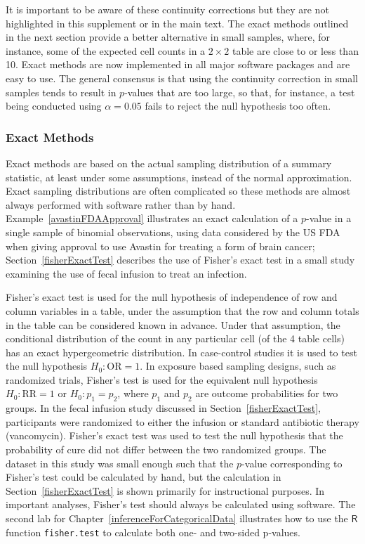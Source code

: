 It is important to be aware of these continuity corrections but they are not highlighted in this supplement or in the main text. The exact methods outlined in the next section provide a better alternative in small samples, where, for instance, some of the expected cell counts in a $2 \times 2$ table are close to or less than 10.  Exact methods are now implemented in all major software packages and are easy to use.   The general consensus is that using the continuity correction in small samples tends to result in $p$-values that are too large, so that, for instance, a test being conducted using $\alpha = 0.05$ fails to reject the null hypothesis too often.


\subsubsection{Exact Methods}

Exact methods are based on the actual sampling distribution of a summary statistic, at least under some assumptions, instead of the normal approximation.  Exact sampling distributions are often complicated so these methods are almost always performed with software rather than by hand. Example~\ref{avastinFDAApproval} illustrates an exact calculation of a $p$-value in a single sample of binomial observations, using data considered by the US FDA when giving approval to use Avastin for treating a form of brain cancer; Section~\ref{fisherExactTest} describes the use of Fisher's exact test in a small study examining the use of fecal infusion to treat an infection.
 
Fisher's exact test is used for the null hypothesis of independence of row and column variables in a table, under the assumption that the row and column totals in the table can be considered known in advance.  Under that assumption, the conditional distribution of the count in any particular cell (of the 4 table cells) has an exact hypergeometric distribution. In case-control studies it is used to test the null hypothesis $H_0: \text{OR} = 1$.    In exposure based sampling designs, such as randomized trials, Fisher's test is used for the equivalent null hypothesis $H_0: \text{RR} = 1$ or $H_0: p_1 = p_2$, where $p_1$ and $p_2$ are outcome probabilities for two groups. In the fecal infusion study discussed in Section~\ref{fisherExactTest}, participants were randomized to either the infusion or standard antibiotic therapy (vancomycin). Fisher's exact test was used to test the null hypothesis that the probability of cure did not differ between the two randomized groups.  The dataset in this study was small enough such that the $p$-value corresponding to Fisher's test could be calculated by hand, but the calculation in Section~\ref{fisherExactTest} is shown primarily for instructional purposes. In important analyses, Fisher's test should always be calculated using software.  The second lab for Chapter~\ref{inferenceForCategoricalData} illustrates how to use the $\textsf{R}$ function \texttt{fisher.test} to calculate both one- and two-sided p-values.

